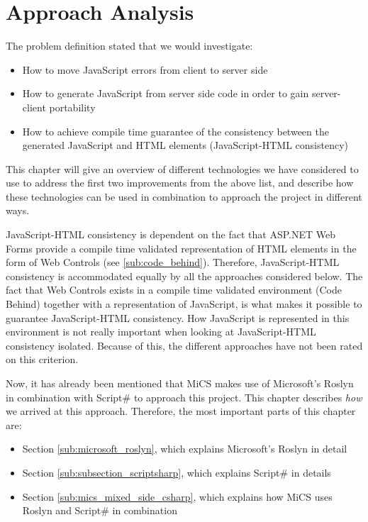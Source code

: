 \chapter{Approach Analysis}
	The problem definition stated that we would investigate:

	\begin{itemize}
		\item How to move JavaScript errors from client to server side
		\item How to generate JavaScript from server side code in order to gain server-client portability
		\item How to achieve compile time guarantee of the consistency between the generated JavaScript and HTML elements (JavaScript-HTML consistency)
	\end{itemize}

	This chapter will give an overview of different technologies we have considered to use to address the first two improvements from the above list, and describe how these technologies can be used in combination to approach the project in different ways.

	JavaScript-HTML consistency is dependent on the fact that ASP.NET Web Forms provide a compile time validated representation of HTML elements in the form of Web Controls (see \ref{sub:code_behind}). Therefore, JavaScript-HTML consistency is accommodated equally by all the approaches considered below. The fact that Web Controls exists in a compile time validated environment (Code Behind) together with a representation of JavaScript, is what makes it possible to guarantee JavaScript-HTML consistency. How JavaScript is represented in this environment is not really important when looking at JavaScript-HTML consistency isolated. Because of this, the different approaches have not been rated on this criterion.

	Now, it has already been mentioned that MiCS makes use of Microsoft's Roslyn in combination with Script\# to approach this project. This chapter describes \emph{how} we arrived at this approach. Therefore, the most important parts of this chapter are:

	\begin{itemize}
		\item Section \ref{sub:microsoft_roslyn}, which explains Microsoft's Roslyn in detail
		\item Section \ref{sub:subsection_scriptsharp}, which explains Script\# in details
		\item Section \ref{sub:mics_mixed_side_csharp}, which explains how MiCS uses Roslyn and Script\# in combination
	\end{itemize}

